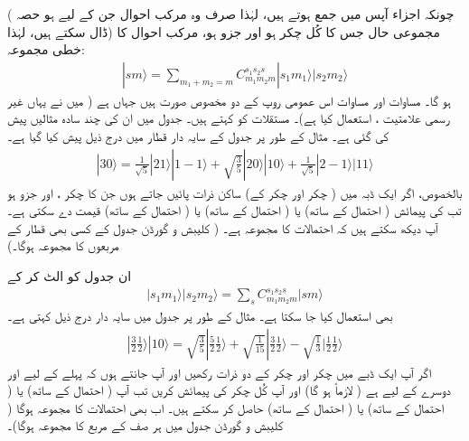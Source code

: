 ( چونکہ  اجزاء آپس میں جمع ہوتے ہیں، لہٰذا صرف وہ مرکب احوال جن کے لیے  ہو حصہ ڈال سکتے ہیں، لہٰذا) مجموعی حال  جس کا کُل چکر  ہو اور  جزو  ہو، مرکب احوال  کا خطی مجموعہ:
\begin{align}\label{مساوات_تین_ابعادی_کلیبش_گورڈن_خطی_مجموعہ}
|sm\rangle=\sum_{m_1+m_2=m}C_{m_1m_2m}^{s_1s_2s} |s_1m_1\rangle |s_2 m_2\rangle
\end{align}
ہو گا۔ مساوات  اور مساوات  اس عمومی روپ کے دو مخصوص صورت ہیں جہاں  ہے ( میں نے یہاں غیر رسمی علامتیت ،
  استعمال کیا ہے)۔ مستقلات  کو
  کہتے ہیں۔ جدول  میں ان کی چند سادہ مثالیں پیش کی گئی ہے۔ مثال کے طور پر  جدول کے سایہ دار قطار میں درج ذیل پیش کیا گیا ہے۔
\begin{align*}
| 3 0 \rangle = \tfrac{1}{\sqrt{5}} | 2 1 \rangle | 1 - 1 \rangle + \sqrt{\tfrac{3}{5}} | 2 0 \rangle | 1 0 \rangle + \tfrac{1}{\sqrt{5}} | 2 - 1 \rangle | 1 1 \rangle
\end{align*}
بالخصوص، اگر ایک ڈبہ میں ( چکر اور  چکر کے) ساکن ذرات پائیں جاتے ہوں جن کا  چکر ، اور  جزو  ہو تب  کی پیمائش ( احتمال کے ساتھ)  یا ( احتمال کے ساتھ)  یا (  احتمال کے ساتھ)  قیمت دے سکتی ہے۔ آپ دیکھ سکتے ہیں کہ احتمالات کا مجموعہ  ہے۔ ( کلیبش و گورڈن جدول کے کسی بھی قطار کے مربعوں کا مجموعہ  ہوگا۔)

 ان جدول کو الٹ کر کے
\begin{align} 
| s_1 m_1 \rangle | s_2 m_2 \rangle = \sum_s C_{m_1 m_2 m}^{s_1 s_2 s} | s m \rangle
\end{align}
 بھی استعمال کیا جا سکتا ہے۔ مثال کے طور پر  جدول میں سایہ دار  درج ذیل کہتی ہے۔
\begin{align*}
| \tfrac{3}{2} \tfrac{1}{2} \rangle | 1 0 \rangle = \sqrt{\tfrac{3}{5}} | \tfrac{5}{2} \tfrac{1}{2} \rangle + \sqrt{\tfrac{1}{15}} | \tfrac{3}{2} \tfrac{1}{2} \rangle - \sqrt{\tfrac{1}{3}} | \tfrac{1}{2} \tfrac{1}{2} \rangle
\end{align*}
اگر آپ ایک ڈبے میں  چکر اور  چکر کے دو ذرات رکھیں اور آپ جانتے ہوں کہ پہلے کے لیے  اور دوسرے کے لیے  ہے (  لازماً  ہو گا) اور آپ کُل چکر  کی پیمائش کریں تب آپ ( احتمال کے ساتھ)  یا (  احتمال کے ساتھ)  یا (  احتمال کے ساتھ)  حاصل کر سکتے ہیں۔ اب بھی احتمالات کا مجموعہ  ہوگا ( کلیبش و گورڈن جدول میں ہر صف کے مربع کا مجموعہ  ہوگا)۔

